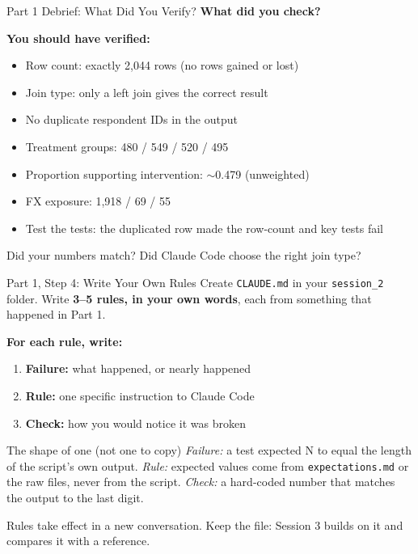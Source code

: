 \documentclass[aspectratio=169, 11pt]{beamer}
\begin{document}
\begin{frame}{Part 1 Debrief: What Did You Verify?}
  \textbf{What did you check?}

  \vspace{0.4em}
  \pause
  \textbf{You should have verified:}
  \begin{itemize}
    \item Row count: exactly 2,044 rows (no rows gained or lost)
    \item Join type: only a left join gives the correct result
    \item No duplicate respondent IDs in the output
    \item Treatment groups: 480 / 549 / 520 / 495
    \item Proportion supporting intervention: $\sim$0.479 (unweighted)
    \item FX exposure: 1,918 / 69 / 55
    \item Test the tests: the duplicated row made the row-count and key tests fail
  \end{itemize}

  \vspace{0.5em}
  Did your numbers match? Did Claude Code choose the right join type?
\end{frame}

\begin{frame}{Part 1, Step 4: Write Your Own Rules}
  Create \texttt{CLAUDE.md} in your \texttt{session\_2} folder. Write \textbf{3--5 rules, in your own words}, each from something that happened in Part 1.

  \vspace{0.5em}
  \textbf{For each rule, write:}
  \begin{enumerate}
    \item \textbf{Failure:} what happened, or nearly happened
    \item \textbf{Rule:} one specific instruction to Claude Code
    \item \textbf{Check:} how you would notice it was broken
  \end{enumerate}

  \vspace{0.5em}
  \begin{block}{The shape of one (not one to copy)}
    \small
    \textit{Failure:} a test expected N to equal the length of the script's own output. \textit{Rule:} expected values come from \texttt{expectations.md} or the raw files, never from the script. \textit{Check:} a hard-coded number that matches the output to the last digit.
  \end{block}

  \vspace{0.5em}
  \alert{Rules take effect in a new conversation. Keep the file: Session 3 builds on it and compares it with a reference.}
\end{frame}
\end{document}
